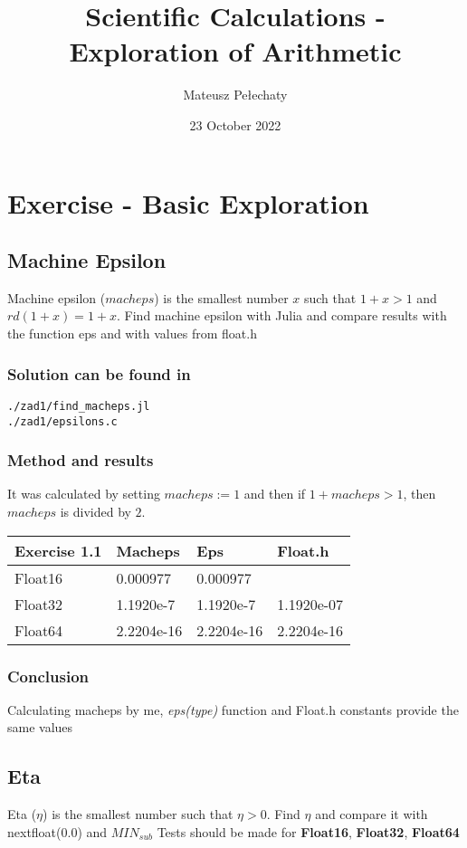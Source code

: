 \documentclass[12pt]{article}
\title{Scientific Calculations - Exploration of Arithmetic}
\author{Mateusz Pełechaty}
\date{23 October 2022}%
\begin{document}
\maketitle

\section{Exercise - Basic Exploration}
\subsection{Machine Epsilon}
Machine epsilon ($macheps$) is the smallest number $x$ such that $1+x > 1$ and $rd(1+x) = 1+x$. \newline
Find machine epsilon with Julia and compare results with the function eps and with values from float.h
\subsubsection*{Solution can be found in}
\begin{verbatim}
./zad1/find_macheps.jl
./zad1/epsilons.c
\end{verbatim}
\subsubsection*{Method and results}
It was calculated by setting $macheps := 1$ and then if $1+macheps > 1$, then $macheps$ is divided by $2$.
\begin{table}[!ht]
    \centering
    \begin{tabular}{|l|l|l|l|}
    \hline
        Exercise 1.1 & Macheps & Eps & Float.h \\ \hline
        Float16 & 0.000977 & 0.000977 & ~ \\ \hline
        Float32 & 1.1920e-7 & 1.1920e-7 & 1.1920e-07 \\ \hline
        Float64 & 2.2204e-16 & 2.2204e-16 & 2.2204e-16 \\ \hline
    \end{tabular}
\end{table}
\subsubsection*{Conclusion}
Calculating macheps by me, \emph{eps(type)} function and Float.h constants provide the same values
\subsection{Eta}
Eta ($\eta$) is the smallest number such that $\eta > 0$. \newline
Find $\eta$ and compare it with nextfloat(0.0) and $MIN_{sub}$ \newline
Tests should be made for \textbf{Float16}, \textbf{Float32}, \textbf{Float64}
\end{document}
